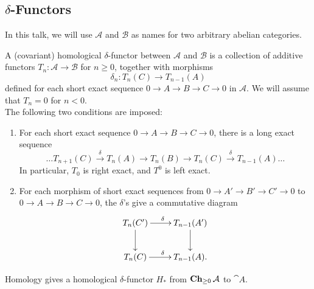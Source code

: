 \subsection{$\delta$-Functors}

\begin{notation}
	In this talk, we will use $\mathcal{A}$ and $\mathcal{B}$ as names for two arbitrary abelian categories.
\end{notation}

\begin{definition}
	A (covariant) homological $\delta$-functor between $\mathcal{A}$ and $\mathcal{B}$ is a collection of additive functors $T_n:\mathcal{A}\rightarrow\mathcal{B}$ for $n\geq0$, together with morphisms
	$$\delta_n:T_n(C)\rightarrow T_{n-1}(A)$$
	defined for each short exact sequence $0\rightarrow A \rightarrow B \rightarrow C \rightarrow 0$ in $\mathcal{A}$.
	We will assume that $T_n = 0$ for $n<0$. \\
	The following two conditions are imposed:
	\begin{enumerate}[label=\arabic*.]
		\item For each short exact sequence $0 \rightarrow A \rightarrow B \rightarrow C \rightarrow 0$, there is a long exact sequence
		$$\dots T_{n+1}(C) \overset{\delta}{\rightarrow} T_n(A) \rightarrow T_n(B) \rightarrow T_n(C) \overset{\delta}{\rightarrow} T_{n-1}(A) \dots$$
		In particular, $T_0$ is right exact, and $T^0$ is left exact.
		
		\item For each morphism of short exact sequences from $0 \rightarrow A' \rightarrow B' \rightarrow C' \rightarrow 0$ to $0 \rightarrow A \rightarrow B \rightarrow C \rightarrow 0$, the $\delta$'s give a commutative diagram
		\begin{align*}
			\begin{gathered}
				\xymatrixcolsep{5pc}\xymatrixcolsep{2pc}\xymatrix{
					T_n(C') \ar[r]^{\delta} \ar[d] & T_{n-1}(A') \ar[d] \\
					T_n(C) \ar[r]^{\delta} & T_{n-1}(A). }
			\end{gathered}
		\end{align*}
	\end{enumerate}
\end{definition}

\begin{example}
	Homology gives a homological $\delta$-functor $H_*$ from $\operatorname{\textbf{Ch}}_{\geq0}\mathcal{A}$ to $\cat{A}$.
\end{example}

